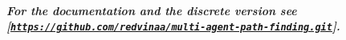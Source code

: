 \subparagraph*{For the documentation and the discrete version see \mbox{[}\href{https://github.com/redvinaa/multi-agent-path-finding.git}{\tt https\+://github.\+com/redvinaa/multi-\/agent-\/path-\/finding.\+git}\mbox{]}.}